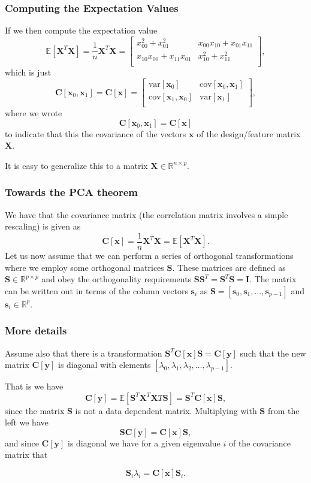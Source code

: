 \documentclass{beamer}
\begin{document}
\begin{frame}
\frametitle{Computing the Expectation Values}

If we then compute the expectation value
\[
\mathbb{E}[\bm{X}^T\bm{X}] = \frac{1}{n}\bm{X}^T\bm{X}=\begin{bmatrix}
x_{00}^2+x_{01}^2 & x_{00}x_{10}+x_{01}x_{11}\\
x_{10}x_{00}+x_{11}x_{01} & x_{10}^2+x_{11}^2\\
\end{bmatrix},
\]
which is just 
\[
\bm{C}[\bm{x}_0,\bm{x}_1] = \bm{C}[\bm{x}]=\begin{bmatrix} \mathrm{var}[\bm{x}_0] & \mathrm{cov}[\bm{x}_0,\bm{x}_1] \\
                              \mathrm{cov}[\bm{x}_1,\bm{x}_0] & \mathrm{var}[\bm{x}_1] \\
             \end{bmatrix},
\]
where we wrote $$\bm{C}[\bm{x}_0,\bm{x}_1] = \bm{C}[\bm{x}]$$ to indicate that this the covariance of the vectors $\bm{x}$ of the design/feature matrix $\bm{X}$.

It is easy to generalize this to a matrix $\bm{X}\in {\mathbb{R}}^{n\times p}$.
\end{frame}

\begin{frame}
\frametitle{Towards the PCA theorem}

We have that the covariance matrix (the correlation matrix involves a simple rescaling) is given as
\[
\bm{C}[\bm{x}] = \frac{1}{n}\bm{X}^T\bm{X}= \mathbb{E}[\bm{X}^T\bm{X}].
\]
Let us now assume that we can perform a series of orthogonal transformations where we employ some orthogonal matrices $\bm{S}$.
These matrices are defined as $\bm{S}\in {\mathbb{R}}^{p\times p}$ and obey the orthogonality requirements $\bm{S}\bm{S}^T=\bm{S}^T\bm{S}=\bm{I}$. The matrix can be written out in terms of the column vectors $\bm{s}_i$ as $\bm{S}=[\bm{s}_0,\bm{s}_1,\dots,\bm{s}_{p-1}]$ and $\bm{s}_i \in {\mathbb{R}}^{p}$.
\end{frame}

\begin{frame}
\frametitle{More details}

Assume also that there is a transformation $\bm{S}^T\bm{C}[\bm{x}]\bm{S}=\bm{C}[\bm{y}]$ such that the new matrix $\bm{C}[\bm{y}]$ is diagonal with elements $[\lambda_0,\lambda_1,\lambda_2,\dots,\lambda_{p-1}]$.  

That is we have
\[
\bm{C}[\bm{y}] = \mathbb{E}[\bm{S}^T\bm{X}^T\bm{X}T\bm{S}]=\bm{S}^T\bm{C}[\bm{x}]\bm{S},
\]
since the matrix $\bm{S}$ is not a data dependent matrix.   Multiplying with $\bm{S}$ from the left we have
\[
\bm{S}\bm{C}[\bm{y}] = \bm{C}[\bm{x}]\bm{S},
\]
and since $\bm{C}[\bm{y}]$ is diagonal we have for a given eigenvalue $i$ of the covariance matrix that

\[
\bm{S}_i\lambda_i = \bm{C}[\bm{x}]\bm{S}_i.
\]
\end{frame}
\end{document}
